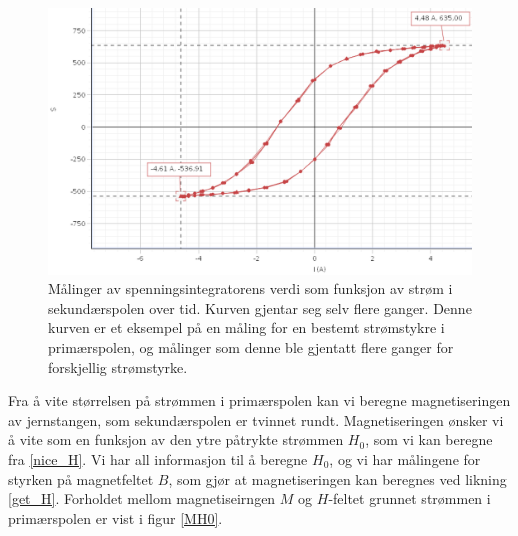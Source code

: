\documentclass[%
 reprint,
 amsmath,amssymb,
 aps,
 norsk,
]{revtex4-1}
\begin{document}
\begin{figure}[h!]
  \centering
  \includegraphics[scale=0.25]{Hysterese.png}
  \caption{Målinger av spenningsintegratorens verdi som funksjon av strøm i sekundærspolen over tid. Kurven gjentar seg selv flere ganger. Denne kurven er et eksempel på en måling for en bestemt strømstykre i primærspolen, og målinger som denne ble gjentatt flere ganger for forskjellig strømstyrke.}
  \label{hysterese123}
\end{figure}
Fra å vite størrelsen på strømmen i primærspolen kan vi beregne magnetiseringen av jernstangen, som sekundærspolen er tvinnet rundt. Magnetiseringen ønsker vi å vite som en funksjon av den ytre påtrykte strømmen $H_0$, som vi kan beregne fra \eqref{nice_H}. Vi har all informasjon til å beregne $H_0$, og vi har målingene for styrken på magnetfeltet $B$, som gjør at magnetiseringen kan beregnes ved likning \eqref{get_H}. Forholdet mellom magnetiseirngen $M$ og $H$-feltet grunnet strømmen i primærspolen er vist i figur \vref{MH0}.
\end{document}
